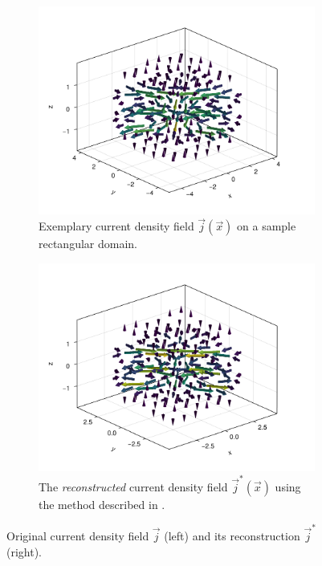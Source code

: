 \documentclass[10pt]{article}
\begin{document}
  \begin{figure}[H]
    \centering
    \begin{subfigure}[t]{0.48\textwidth}
      \centering
      \includegraphics[width=\textwidth]{../figures/cdpr-j-field.pdf}
      \caption{Exemplary current density field $\vec{j}(\vec{x})$ on a sample rectangular domain.}
      \label{fig:cdpr-j-field}
    \end{subfigure}
    \hfill
    \begin{subfigure}[t]{0.48\textwidth}
      \centering
      \includegraphics[width=\textwidth]{../figures/cdprr-j-field.pdf}
      \caption{The \textit{reconstructed} current density field $\vec{j}^*(\vec{x})$ using the method described in .}
      \label{fig:cdprr-j-field}
    \end{subfigure}
    \caption{Original current density field $\vec{j}$ (left) and its reconstruction $\vec{j}^*$ (right).}
  \end{figure}
\end{document}
